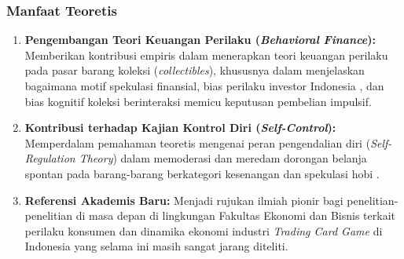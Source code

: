 \documentclass[12pt,a4paper]{article}
\numberwithin{equation}{section}
\numberwithin{table}{section}
\numberwithin{figure}{section}
\begin{document}
\subsubsection{Manfaat Teoretis}
\begin{enumerate}
  \item \textbf{Pengembangan Teori Keuangan Perilaku (\emph{Behavioral Finance}):} Memberikan kontribusi empiris dalam menerapkan teori keuangan perilaku pada pasar barang koleksi (\emph{collectibles}), khususnya dalam menjelaskan bagaimana motif spekulasi finansial, bias perilaku investor Indonesia \citep{colline2024biases}, dan bias kognitif koleksi berinteraksi memicu keputusan pembelian impulsif.
  \item \textbf{Kontribusi terhadap Kajian Kontrol Diri (\emph{Self-Control}):} Memperdalam pemahaman teoretis mengenai peran pengendalian diri (\emph{Self-Regulation Theory}) dalam memoderasi dan meredam dorongan belanja spontan pada barang-barang berkategori kesenangan dan spekulasi hobi \citep{prihatiningrum2021effect, apidana2022peran, lienardy2026role}.
  \item \textbf{Referensi Akademis Baru:} Menjadi rujukan ilmiah pionir bagi penelitian-penelitian di masa depan di lingkungan Fakultas Ekonomi dan Bisnis terkait perilaku konsumen dan dinamika ekonomi industri \emph{Trading Card Game} di Indonesia yang selama ini masih sangat jarang diteliti.
\end{enumerate}
\end{document}
